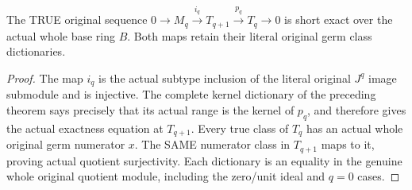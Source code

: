 \begin{theorem}
\label{hir:relative-normal-uniformtrunc-original-short-exact}
\leanok
{}
The TRUE original sequence
$0\to M_q\xrightarrow{i_q}T_{q+1}\xrightarrow{p_q}T_q\to0$
is short exact over the actual whole base ring $B$. Both maps retain their
literal original germ class dictionaries.
\end{theorem}
\begin{proof}
The map $i_q$ is the actual subtype inclusion of the literal original
$J^q$ image submodule and is injective. The complete kernel dictionary of
the preceding theorem says precisely that its actual range is the kernel
of $p_q$, and therefore gives the actual exactness equation at $T_{q+1}$.
Every true class of $T_q$ has an actual whole original germ numerator $x$.
The SAME numerator class in $T_{q+1}$ maps to it, proving actual quotient
surjectivity. Each dictionary is an equality in the genuine whole original
quotient module, including the zero/unit ideal and $q=0$ cases.
\end{proof}

